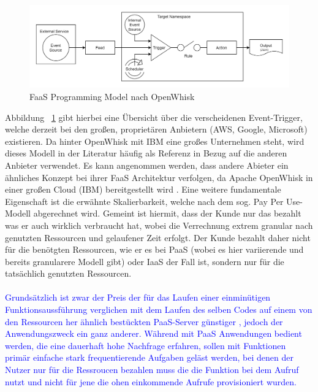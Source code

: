 \documentclass[11pt]{article}
\begin{document}
\begin{figure}[H]
\caption{FaaS Programming Model nach OpenWhisk \cite{openWhisk2020ProgrammingModel}}
\label{fig:openWhiskProgrammingModel}
\centering
\includegraphics[width=1\textwidth]{ProgrammingModel}
\end{figure}
Abbildung ~\ref{fig:openWhiskProgrammingModel} gibt hierbei eine Übersicht über die verscheidenen Event-Trigger, welche derzeit bei den großen, proprietären Anbietern (AWS, Google, Microsoft) existieren. Da hinter OpenWhisk mit IBM eine großes Unternehmen steht, wird dieses Modell in der Literatur häufig als Referenz in Bezug auf die anderen Anbieter verwendet. Es kann angenommen werden, dass andere Abieter ein ähnliches Konzept bei ihrer FaaS Architektur verfolgen, da Apache OpenWhisk in einer großen Cloud (IBM) bereitgestellt wird \cite{van2019spec}. Eine weitere fundamentale Eigenschaft ist die erwähnte Skalierbarkeit, welche nach dem sog. \glqq Pay Per Use\grqq{}-Modell abgerechnet wird. Gemeint ist hiermit, dass der Kunde nur das bezahlt was er auch wirklich verbraucht hat, wobei die Verrechnung extrem granular nach genutzten Ressourcen und gelaufener Zeit erfolgt. Der Kunde bezahlt daher nicht für die benötgten Ressourcen, wie er es bei PaaS (wobei es hier variierende und bereits granularere Modell gibt) oder IaaS der Fall ist, sondern nur für die tatsächlich genutzten Ressourcen. \\\\
\textcolor{blue}{Grundsätzlich ist zwar der Preis der für das Laufen einer einminütigen Funktionsaussführung verglichen mit dem Laufen des selben Codes auf einem von den Ressourcen her ähnlich bestückten PaaS-Server günstiger \cite{jonas2019cloud}, jedoch der Anwendungszweck ein ganz anderer. Während mit PaaS Anwendungen bedient werden, die eine dauerhaft hohe Nachfrage erfahren, sollen mit Funktionen primär einfache stark frequentierende Aufgaben geläst werden, bei denen der Nutzer nur für die Ressroucen bezahlen muss die die Funktion bei dem Aufruf nutzt und nicht für jene die ohen einkommende Aufrufe provisioniert wurden.} \\\\
\end{document}
